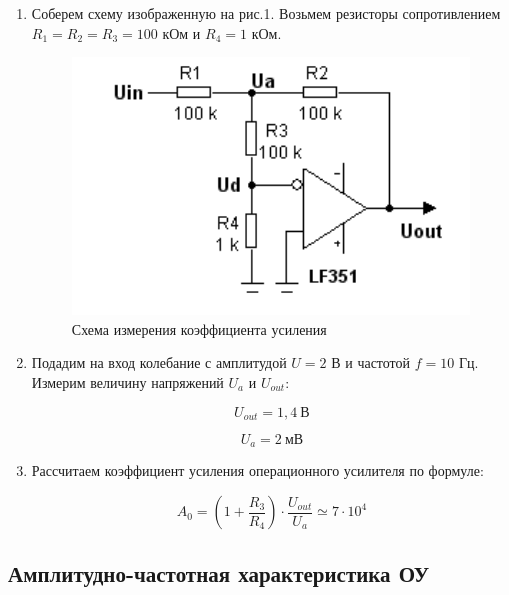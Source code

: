 \documentclass[a4paper, 12pt]{article}%
\begin{document}
\begin{enumerate}

\item Соберем схему изображенную на рис.1. Возьмем резисторы сопротивлением $R_1 = R_2 = R_3 = 100$ кОм и $R_4 = 1$ кОм.

\begin{figure}[h!]
\centering
\includegraphics[scale=1]{images/scheme_1.png}
\caption{Схема измерения коэффициента усиления}
\label{fig:scheme_1}
\end{figure}

\item Подадим на вход колебание с амплитудой $U = 2$ В и частотой $f = 10$ Гц. Измерим величину напряжений $U_a$ и $U_{out}$:

\[U_{out} = 1,4 \: \text{В}\]

\[U_a = 2 \: \text{мВ}\]

\item Рассчитаем коэффициент усиления операционного усилителя по формуле:

\[A_0 = (1 + \frac{R_3}{R_4}) \cdot \frac{U_{out}}{U_a} \simeq 7 \cdot 10^4\]

\end{enumerate}

\subsection{Амплитудно-частотная характеристика ОУ}
\end{document}

